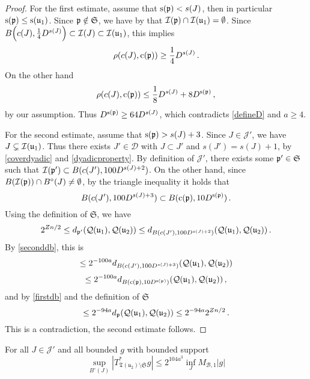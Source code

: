     \begin{proof}
        For the first estimate, assume that ${\mathrm{s}}({\mathfrak p}) < s(J)$, then in particular ${\mathrm{s}}({\mathfrak p}) \le {\mathrm{s}}({\mathfrak u}_1)$. Since ${\mathfrak p} \notin \mathfrak{S}$, we have by  that ${\mathcal{I}}({\mathfrak p}) \cap {\mathcal{I}}({\mathfrak u}_1) = \emptyset$.
        Since $B\Big(c(J), \frac{1}{4} D^{s(J)}\Big) \subset {\mathcal{I}}(J) \subset {\mathcal{I}}({\mathfrak u}_1)$, this implies
        $$
            \rho(c(J), {\mathrm{c}}({\mathfrak p})) \ge \frac{1}{4}D^{s(J)}\,.
        $$
        On the other hand
        $$
            \rho(c(J), {\mathrm{c}}({\mathfrak p})) \le \frac{1}{8} D^{s(J)} + 8 D^{{\mathrm{s}}({\mathfrak p})}\,,
        $$
        by our assumption. Thus $D^{{\mathrm{s}}({\mathfrak p})} \ge 64 D^{s(J)}$, which contradicts \eqref{defineD} and $a \ge 4$.

        For the second estimate, assume that ${\mathrm{s}}({\mathfrak p}) > s(J) + 3$. Since $J \in \mathcal{J}'$, we have $J \subsetneq {\mathcal{I}}({\mathfrak u}_1)$. Thus there exists $J' \in \mathcal{D}$ with $J \subset J'$ and $s(J') = s(J) + 1$, by \eqref{coverdyadic} and \eqref{dyadicproperty}. By definition of $\mathcal{J}'$, there exists some ${\mathfrak p}' \in \mathfrak{S}$ such that ${\mathcal{I}}({\mathfrak p}') \subset B(c(J'), 100 D^{s(J) + 2})$. On the other hand, since $B({\mathcal{I}}({\mathfrak p})) \cap B^\circ(J) \ne \emptyset$, by the triangle inequality it holds that
        $$
            B(c(J'), 100 D^{s(J) + 3}) \subset B({\mathrm{c}}({\mathfrak p}), 10 D^{{\mathrm{s}}({\mathfrak p})})\,.
        $$
        Using the definition of $\mathfrak{S}$, we have
        $$
            2^{Zn/2} \le d_{{\mathfrak p}'}({\mathcal{Q}}({\mathfrak u}_1), {\mathcal{Q}}({\mathfrak u}_2)) \le d_{B(c(J'), 100 D^{s(J) + 2})}({\mathcal{Q}}({\mathfrak u}_1), {\mathcal{Q}}({\mathfrak u}_2))\,.
        $$
        By \eqref{seconddb}, this is
        $$
            \le 2^{-100a} d_{B(c(J'), 100 D^{s(J) + 3})}({\mathcal{Q}}({\mathfrak u}_1), {\mathcal{Q}}({\mathfrak u}_2))
        $$
        $$
            \le 2^{-100a} d_{B({\mathrm{c}}({\mathfrak p}), 10 D^{{\mathrm{s}}({\mathfrak p})})}({\mathcal{Q}}({\mathfrak u}_1), {\mathcal{Q}}({\mathfrak u}_2))\,,
        $$
        and by \eqref{firstdb} and the definition of $\mathfrak{S}$
        $$
            \le 2^{-94a} d_{{\mathfrak p}}({\mathcal{Q}}({\mathfrak u}_1), {\mathcal{Q}}({\mathfrak u}_2)) \le 2^{-94a} 2^{Zn/2}\,.
        $$
        This is a contradiction, the second estimate follows.
    \end{proof}


    \begin{lemma}
        \label{local-tree-control}
        \leanok
        For all $J \in \mathcal{J}'$ and all bounded $g$ with bounded support
        $$
            \sup_{B^\circ{}(J)} |T_{\mathfrak{T}(\mathfrak{u}_2)\setminus\mathfrak{S}}^* g| \le 2^{104a^3} \inf_J M_{\mathcal{B},1}|g|
        $$
    \end{lemma}


